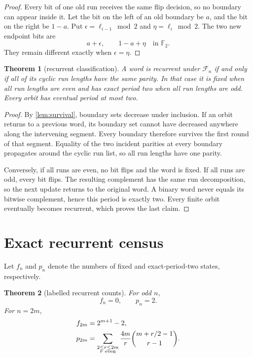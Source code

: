 \documentclass[11pt,a4paper]{amsart}
\newtheorem{theorem}{Theorem}[section]
\theoremstyle{definition}
\theoremstyle{remark}
\newcommand{\F}{\mathcal F}
\begin{document}
\begin{proof}
Every bit of one old run receives the same flip decision, so no boundary can
appear inside it.  Let the bit on the left of an old boundary be \(a\), and
the bit on the right be \(1-a\).  Put
\(\epsilon=\ell_{i-1}\bmod2\) and
\(\eta=\ell_i\bmod2\).  The two new endpoint bits are
\[
                  a+\epsilon,\qquad 1-a+\eta
                  \quad\text{in }\mathbb F_2.
\]
They remain different exactly when \(\epsilon=\eta\).
\end{proof}

\begin{theorem}[recurrent classification]\label{thm:recurrence}
A word is recurrent under \(\F_n\) if and only if all of its cyclic run
lengths have the same parity.  In that case it is fixed when all run lengths
are even and has exact period two when all run lengths are odd.  Every orbit
has eventual period at most two.
\end{theorem}

\begin{proof}
By \cref{lem:survival}, boundary sets decrease under inclusion.  If an orbit
returns to a previous word, its boundary set cannot have decreased anywhere
along the intervening segment.  Every boundary therefore survives the first
round of that segment.  Equality of the two incident parities at every
boundary propagates around the cyclic run list, so all run lengths have one
parity.

Conversely, if all runs are even, no bit flips and the word is fixed.  If all
runs are odd, every bit flips.  The resulting complement has the same run
decomposition, so the next update returns to the original word.  A binary
word never equals its bitwise complement, hence this period is exactly two.
Every finite orbit eventually becomes recurrent, which proves the last
claim.
\end{proof}

\section{Exact recurrent census}

Let \(f_n\) and \(p_n\) denote the numbers of fixed and exact-period-two
states, respectively.

\begin{theorem}[labelled recurrent counts]\label{thm:census}
For odd \(n\),
\[
                         f_n=0,\qquad p_n=2.
\]
For \(n=2m\),
\begin{align}
 f_{2m}&=2^{m+1}-2,                                      \label{eq:fixed}\\
 p_{2m}&=\sum_{\substack{2\le r\le2m\\r\ {\rm even}}}
 \frac{4m}{r}\binom{m+r/2-1}{r-1}.                       \label{eq:two}
\end{align}
\end{theorem}
\end{document}
